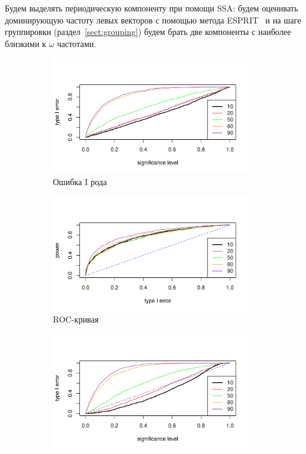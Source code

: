 \documentclass[specialist,
substylefile = spbu_report.rtx,
subf,href,colorlinks=true, 12pt]{disser}
\theoremstyle{definition}
\begin{document}
Будем выделять периодическую компоненту при помощи SSA: будем оценивать доминирующую частоту левых векторов с помощью метода \textsf{ESPRIT}~\cite[Раздел 3.1]{SSA_R} и на шаге группировки (раздел~\ref{sect:grouping}) будем брать две компоненты с наиболее близкими к $\omega$ частотами. 
\begin{figure}[h!]
	\captionsetup[subfigure]{justification=Centering}
	\begin{subfigure}[t]{0.5\textwidth}
		\centering
		\includegraphics[width=0.95\textwidth]{img/type1error_sin.pdf}
		\caption{Ошибка I рода}
		\label{fig:sin_type1error}
	\end{subfigure}\hspace{\fill}
	\begin{subfigure}[t]{0.5\textwidth}
		\centering
		\includegraphics[width=0.95\textwidth]{img/roc_sin.pdf}	
		\caption{ROC-кривая}
		\label{fig:sin_roc}
	\end{subfigure}
	\begin{subfigure}[t]{0.5\textwidth}
		\centering
		\includegraphics[width=0.95\textwidth]{img/type1error_sin_est_noise.pdf}

\end{subfigure}
\end{figure}
\end{document}
